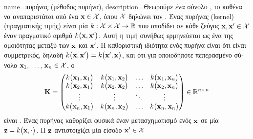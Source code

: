 {name={\foreignlanguage{greek}{πυρήνας (μέθοδος πυρήνα)}}, 
	description={\foreignlanguage{greek}{Θεωρούμε ένα σύνολο} , 
		\foreignlanguage{greek}{το καθένα να αναπαριστάται από ένα}  ${\bf x} \in \mathcal{X}$, 
		\foreignlanguage{greek}{όπου $\mathcal{X}$ δηλώνει τον} . \foreignlanguage{greek}{Ένας πυρήνας} 
		(kernel) \foreignlanguage{greek}{(πραγματικής τιμής) είναι μία}  
		$k: \mathcal{X} \times \mathcal{X} \rightarrow \mathbb{R}$ \foreignlanguage{greek}{που αποδίδει σε κάθε ζεύγος} 
		 ${\bf x}, {\bf x}' \in \mathcal{X}$ \foreignlanguage{greek}{έναν πραγματικό αριθμό 
		$k\big({\bf x},{\bf x}'\big)$. Αυτή η τιμή συνήθως ερμηνεύεται ως ένα}  \foreignlanguage{greek}{της 
		ομοιότητας μεταξύ των ${\bf x}$ και ${\bf x}'$. Η καθοριστική ιδιότητα ενός πυρήνα είναι ότι είναι
		συμμετρικός, δηλαδή $k\big({\bf x},{\bf x}'\big) = k\big({\bf x}',{\bf x}\big)$, και ότι για οποιοδήποτε πεπερασμένο 
		σύνολο}  ${\bf x}_1, \,\ldots, \,{\bf x}_n \in \mathcal{X}$, \foreignlanguage{greek}{ο}  
	  	\begin{equation}
	 		\nonumber
	 		\mathbf{K} = \begin{pmatrix}
	 			k\big({\bf x}_1,{\bf x}_1\big) & k\big({\bf x}_1,{\bf x}_2\big) & \ldots & k\big({\bf x}_1,{\bf x}_n\big) \\
	 			k\big({\bf x}_2,{\bf x}_1\big) & k\big({\bf x}_2,{\bf x}_2\big) & \ldots & k\big({\bf x}_2,{\bf x}_n\big) \\
	 			\vdots											
	 			& \vdots & \ddots & \vdots \\
	 			k\big({\bf x}_n,{\bf x}_1\big) & k\big({\bf x}_n,{\bf x}_2\big) & \ldots & k\big({\bf x}_n,{\bf x}_n\big) 
	 		\end{pmatrix} \in \mathbb{R}^{n \times n}
	 	\end{equation}
	 	\foreignlanguage{greek}{είναι} . \foreignlanguage{greek}{Ένας πυρήνας καθορίζει φυσικά έναν μετασχηματισμό ενός} 
		 ${\bf x}$ \foreignlanguage{greek}{σε μία}  ${\bf z} = k\big({\bf x},\cdot\big)$. 
		\foreignlanguage{greek}{Η}  ${\bf z}$ \foreignlanguage{greek}{αντιστοιχίζει μία είσοδο ${\bf x}' \in \mathcal{X}$ 
}}}
